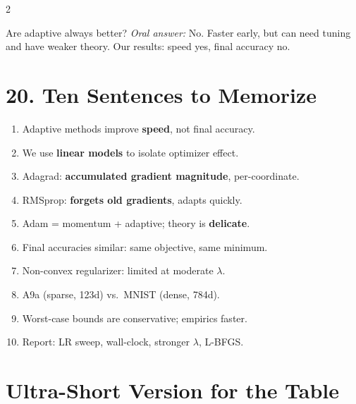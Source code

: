 \documentclass[a4paper,9pt]{article}
\newcommand{\oral}{\textit{\color{darkgray}Oral answer: }}
\begin{document}
\begin{multicols}{2}
\begin{qa}{Are adaptive always better?}
\oral No. Faster early, but can need tuning and have weaker theory. Our results: speed yes, final accuracy no.
\end{qa}

\section{20. Ten Sentences to Memorize}

\begin{tcolorbox}[title=\textbf{Must-Know}, colback=unibaselteal!12]
\begin{enumerate}
    \item Adaptive methods improve \textbf{speed}, not final accuracy.
    \item We use \textbf{linear models} to isolate optimizer effect.
    \item Adagrad: \textbf{accumulated gradient magnitude}, per-coordinate.
    \item RMSprop: \textbf{forgets old gradients}, adapts quickly.
    \item Adam = momentum + adaptive; theory is \textbf{delicate}.
    \item Final accuracies similar: same objective, same minimum.
    \item Non-convex regularizer: limited at moderate \(\lambda\).
    \item A9a (sparse, 123d) vs.\ MNIST (dense, 784d).
    \item Worst-case bounds are conservative; empirics faster.
    \item Report: LR sweep, wall-clock, stronger \(\lambda\), L-BFGS.
\end{enumerate}
\end{tcolorbox}

\end{multicols}

\newpage

\section*{Ultra-Short Version for the Table}
\end{document}
